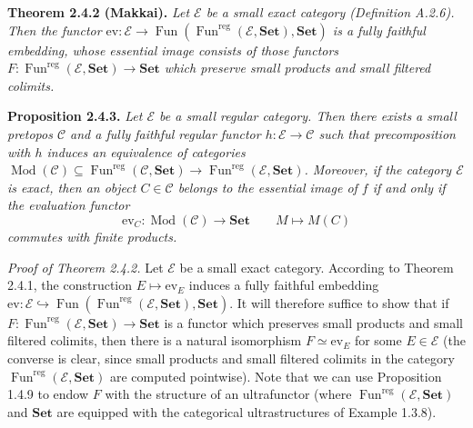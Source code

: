 \documentclass[11pt]{article}
\newcommand{\E}{\mathcal{E}}          %
\newcommand{\C}{\mathcal{C}}          %
\newcommand{\Fun}{\operatorname{Fun}}
\newcommand{\Funreg}{\Fun^{\mathrm{reg}}}
\newcommand{\Mod}{\operatorname{Mod}}
\newcommand{\Set}{\mathbf{Set}}
\newcommand{\ev}{\mathrm{ev}}
\begin{document}

\noindent\textbf{Theorem 2.4.2 (Makkai).} \emph{Let $\E$ be a small exact category (Definition A.2.6). Then the functor $\ev : \E \to \Fun(\Funreg(\E,\Set),\Set)$ is a fully faithful embedding, whose essential image consists of those functors $F : \Funreg(\E,\Set) \to \Set$ which preserve small products and small filtered colimits.}



\medskip
\noindent\textbf{Proposition 2.4.3.} \emph{Let $\E$ be a small regular category. Then there exists a small pretopos $\C$ and a fully faithful regular functor $h : \E \to \C$ such that precomposition with $h$ induces an equivalence of categories $\Mod(\C) \subseteq \Funreg(\C,\Set) \to \Funreg(\E,\Set)$. Moreover, if the category $\E$ is exact, then an object $C \in \C$ belongs to the essential image of $f$ if and only if the evaluation functor}
\[
\ev_C : \Mod(\C) \to \Set \qquad M \mapsto M(C)
\]
\emph{commutes with finite products.}



\medskip
\noindent\emph{Proof of Theorem 2.4.2.} Let $\E$ be a small exact category. According to Theorem 2.4.1, the construction $E \mapsto \ev_E$ induces a fully faithful embedding $\ev : \E \hookrightarrow \Fun(\Funreg(\E,\Set),\Set)$. It will therefore suffice to show that if $F : \Funreg(\E,\Set) \to \Set$ is a functor which preserves small products and small filtered colimits, then there is a natural isomorphism $F \simeq \ev_E$ for some $E \in \E$ (the converse is clear, since small products and small filtered colimits in the category $\Funreg(\E,\Set)$ are computed pointwise). Note that we can use Proposition 1.4.9 to endow $F$ with the structure of an ultrafunctor (where $\Funreg(\E,\Set)$ and $\Set$ are equipped with the categorical ultrastructures of Example 1.3.8).
\end{document}
